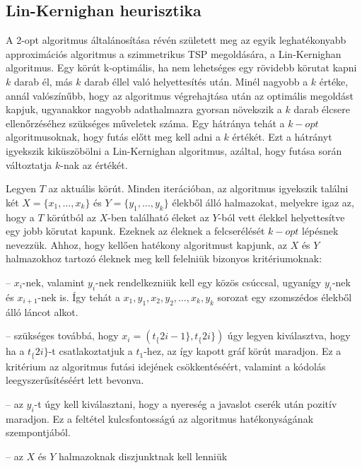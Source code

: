 \subsection{Lin-Kernighan heurisztika}

A 2-opt algoritmus általánosítása révén született meg az egyik leghatékonyabb approximációs algoritmus a szimmetrikus TSP megoldására, a Lin-Kernighan algoritmus. Egy körút k-optimális, ha nem lehetséges egy rövidebb körutat kapni \(k\) darab él, más \(k\) darab éllel való helyettesítés után. Minél nagyobb a \(k\) értéke, annál valószínűbb, hogy az algoritmus végrehajtása után az optimális megoldást kapjuk, ugyanakkor nagyobb adathalmazra gyorsan növekszik a \(k\) darab élcsere ellenőrzéséhez szükséges műveletek száma. Egy hátránya tehát a \(k-opt\) algoritmusoknak, hogy futás előtt meg kell adni a \(k\) értékét. Ezt a hátrányt igyekszik kiküszöbölni a Lin-Kernighan algoritmus, azáltal, hogy futása során változtatja \(k\)-nak az értékét.

Legyen \(T\) az aktuális körút. Minden iterációban, az algoritmus igyekszik találni két \(X = \{x_1,\dots,x_k\}\) és \(Y = \{y_1,\dots,y_k\}\) élekből álló halmazokat, melyekre igaz az, hogy a \(T\) körútból az \(X\)-ben található éleket az \(Y\)-ból vett élekkel helyettesítve egy jobb körutat kapunk. Ezeknek az éleknek a felcserélését \(k-opt\) lépésnek nevezzük. Ahhoz, hogy kellően hatékony algoritmust kapjunk, az \(X\) és \(Y\) halmazokhoz tartozó éleknek meg kell felelniük bizonyos kritériumoknak:

\begin{description}
	\setlength{\itemsep}{0.04mm}
	\item[(a) A szekvenciális csere kritériuma] -- \(x_i\)-nek, valamint \(y_i\)-nek rendelkezniük kell egy közös csúccsal, ugyanígy \(y_i\)-nek és \(x_{i+1}\)-nek is. Így tehát a \(x_1,y_1,x_2,y_2,\dots,x_k,y_k\) sorozat egy szomszédos élekből álló láncot alkot.
	\item[(b) A megvalósíthatósági kritérium] -- szükséges továbbá, hogy \(x_i = (t_\{2i-1\},t_\{2i\})\) úgy legyen kiválasztva, hogy ha a \(t_\{2i\}\)-t csatlakoztatjuk a \(t_1\)-hez, az így kapott gráf körút maradjon. Ez a kritérium az algoritmus futási idejének csökkentéséért, valamint a kódolás leegyszerűsítéséért lett bevonva.
	\item[(c) A pozitív nyereség kritériuma] -- az \(y_i\)-t úgy kell kiválasztani, hogy a nyereség a javaslot cserék után pozitív maradjon. Ez a feltétel kulcsfontosságú az algoritmus hatékonyságának szempontjából.
	\item[(d) A diszjunktivitás kritérium] -- az \(X\) és \(Y\) halmazoknak diszjunktnak kell lenniük
\end{description}
